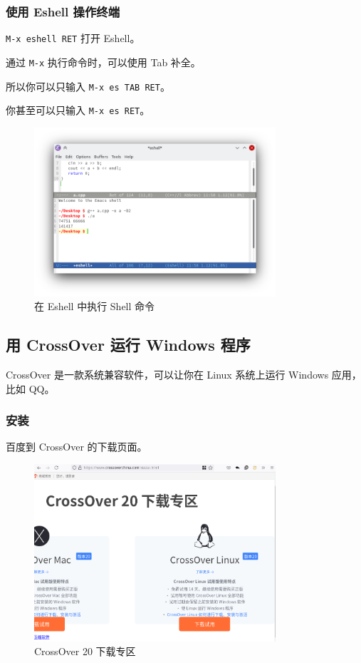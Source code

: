 \documentclass[UTF-8]{ctexart}
\begin{document}
			\subsubsection{使用 Eshell 操作终端}
			
				\texttt{M-x eshell RET} 打开 Eshell。
				
				通过 \texttt{M-x} 执行命令时，可以使用 Tab 补全。
				
				所以你可以只输入 \texttt{M-x es TAB RET}。
				
				你甚至可以只输入 \texttt{M-x es RET}。
				
				\begin{figure}[H]
					\centering
					\includegraphics[width=0.8\textwidth]{fig/emacs_eshall.png}
					\caption*{在 Eshell 中执行 Shell 命令}
				\end{figure}
			
		\subsection{用 CrossOver 运行 Windows 程序}
			
			CrossOver 是一款系统兼容软件，可以让你在 Linux 系统上运行 Windows 应用，比如 QQ。
			
			\subsubsection{安装}
				
				百度到 CrossOver 的下载页面。
				
				\begin{figure}[H]
					\centering
					\includegraphics[width=0.8\textwidth]{fig/crossover_download.png}
					\caption*{CrossOver 20 下载专区}
				\end{figure}
				
\end{document}
